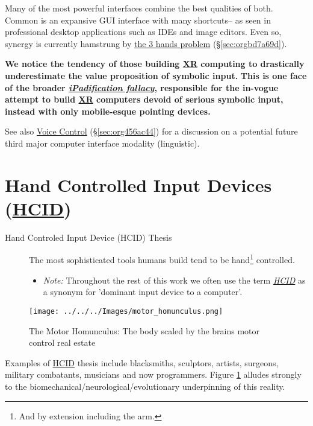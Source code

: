 \documentclass[logo,bsc,singlespacing,parskip]{infthesis}
\begin{document}
Many of the most powerful interfaces combine the best qualities of both.
Common is an expansive GUI interface with many shortcuts-- as seen in professional desktop applications such as IDEs and image editors.
Even so, synergy is currently hamstrung by \hyperref[sec:orgbd7a69d]{the 3 hands problem} (\S \ref{sec:orgbd7a69d}).

\textbf{We notice the tendency of those building \hyperref[orgf7f8e78]{XR} computing to drastically underestimate the value proposition of symbolic input.}
\textbf{This is one face of the broader \emph{\hyperref[ipadification fallacy]{iPadification fallacy}}, responsible for the in-vogue attempt to build \hyperref[orgf7f8e78]{XR} computers devoid of serious symbolic input, instead with only mobile-esque pointing devices.}

See also \hyperref[sec:org456ac44]{Voice Control} (\S \ref{sec:org456ac44}) for a discussion on a potential future third major computer interface modality (linguistic).

\section{Hand Controlled Input Devices (\hyperref[org30e2275]{HCID})}
\label{sec:orgde35632}
\begin{mdframed}
\begin{description}
\item[{Hand Controled Input Device (\label{org30e2275}HCID) Thesis}] The most sophisticated tools humans build tend to be hand\footnote{And by extension including the arm.} controlled.
\begin{itemize}
\item \emph{Note:} Throughout the rest of this work we often use the term \emph{\hyperref[org30e2275]{HCID}} as a synonym for 'dominant input device to a computer'.
\end{itemize}
\end{description}
\end{mdframed}

\begin{figure}[h]
\centering
\texttt{[image: ../../../Images/motor\_homunculus.png]}
\caption{\label{fig:motohomo}The Motor Homunculus: The body scaled by the brains motor control real estate}
\end{figure}

Examples of \hyperref[org30e2275]{HCID} thesis include blacksmiths, sculptors, artists, surgeons, military combatants, musicians and now programmers.
Figure \ref{fig:motohomo} alludes strongly to the biomechanical/neurological/evolutionary underpinning of this reality.
\end{document}
